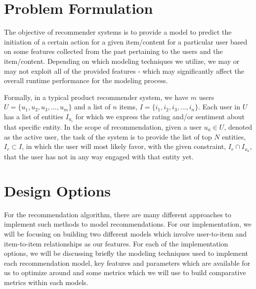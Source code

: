 \documentclass[a4paper, 11pt]{article}
\begin{document}
\section*{Problem Formulation}
The objective of recommender systems is to provide a model to predict the initiation of a certain action for a given item/content for a particular user based on some features collected from the past pertaining to the users and the item/content. Depending on which modeling techniques we utilize, we may or may not exploit all of the provided features - which may significantly affect the overall runtime performance for the modeling process.

Formally, in a typical product recommender system, we have $m$ users $U = \{u_1, u_2, u_3, ..., u_m\}$ and a list of $n$ items, $I = \{ i_1, i_2, i_3, ..., i_n \}$. Each user in $U$ has a list of entities $I_{u_i}$ for which we express the rating and/or sentiment about that specific entity. In the scope of recommendation, given a user $u_a \in U$, denoted as the active user, the task of the system is to provide the list of top $N$ entities, $I_r \subset I$, in which the user will most likely favor, with the given constraint, $I_r \cap I_{u_a}$, that the user has not in any way engaged with that entity yet.

\section*{Design Options}
For the recommendation algorithm, there are many different approaches to implement such methods to model recommendations. For our implementation, we will be focusing on building two different models which involve user-to-item and item-to-item relationships as our features. For each of the implementation options, we will be discussing briefly the modeling techniques used to implement each recommendation model, key features and parameters which are available for us to optimize around and some metrics which we will use to build comparative metrics within each models.
\end{document}
